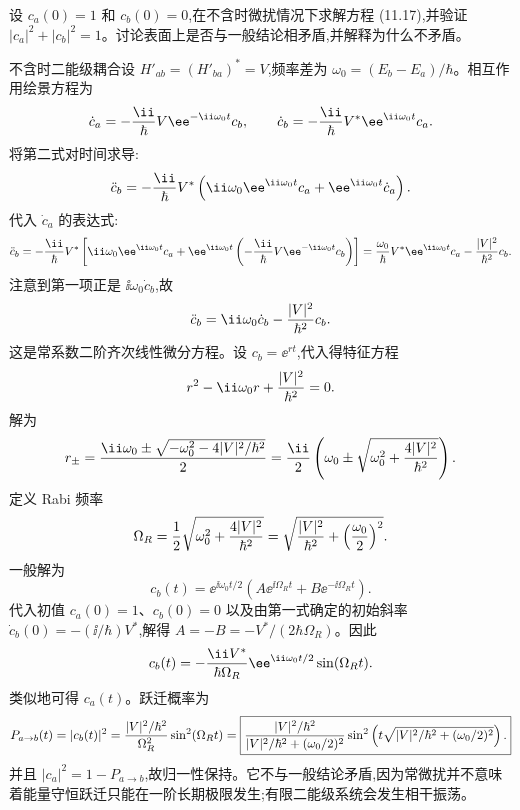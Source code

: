\begin{question}
设 $c_a(0)=1$ 和 $c_b(0)=0$,在不含时微扰情况下求解方程 (11.17),并验证 $|c_a|^2+|c_b|^2=1$。讨论表面上是否与一般结论相矛盾,并解释为什么不矛盾。

\par\smallskip
{}

\end{question}
\begin{solution}
不含时二能级耦合设 $H'_{ab}=(H'_{ba})^*=V$,频率差为 $\omega_0=(E_b-E_a)/\hbar$。相互作用绘景方程为
\[
\dot c_a=-{\ii\over\hbar}V \ee^{-\ii\omega_0t}c_b,
\qquad
\dot c_b=-{\ii\over\hbar}V^* \ee^{\ii\omega_0t}c_a.
\]
将第二式对时间求导:
\[
\ddot c_b=-{\ii\over\hbar}V^*\left(\ii\omega_0 \ee^{\ii\omega_0t}c_a+\ee^{\ii\omega_0t}\dot c_a\right).
\]
代入 $\dot c_a$ 的表达式:
\[
\ddot c_b=-{\ii\over\hbar}V^*\left[\ii\omega_0 \ee^{\ii\omega_0t}c_a
+\ee^{\ii\omega_0t}\left(-{\ii\over\hbar}V \ee^{-\ii\omega_0t}c_b\right)\right]
={\omega_0\over\hbar}V^* \ee^{\ii\omega_0t}c_a-{|V|^2\over\hbar^2}c_b.
\]
注意到第一项正是 $\ii\omega_0\dot c_b$,故
\[
\ddot c_b=\ii\omega_0\dot c_b-{|V|^2\over\hbar^2}c_b.
\]
这是常系数二阶齐次线性微分方程。设 $c_b=\ee^{rt}$,代入得特征方程
\[
r^2-\ii\omega_0 r+{|V|^2\over\hbar^2}=0.
\]
解为
\[
r_\pm={\ii\omega_0\pm\sqrt{-\omega_0^2-4|V|^2/\hbar^2}\over2}
={\ii\over2}\left(\omega_0\pm\sqrt{\omega_0^2+{4|V|^2\over\hbar^2}}\right).
\]
定义 Rabi 频率
\[
\Omega_R={1\over2}\sqrt{\omega_0^2+{4|V|^2\over\hbar^2}}
=\sqrt{{|V|^2\over\hbar^2}+\left({\omega_0\over2}\right)^2}.
\]
一般解为
\[
c_b(t)=\ee^{\ii\omega_0t/2}\left(A \ee^{\ii\Omega_R t}+B \ee^{-\ii\Omega_R t}\right).
\]
代入初值 $c_a(0)=1$、$c_b(0)=0$ 以及由第一式确定的初始斜率 $\dot c_b(0)=-(\ii/\hbar)V^*$,解得 $A=-B=-V^*/(2\hbar\Omega_R)$。因此
\[
c_b(t)=-{\ii V^*\over\hbar\Omega_R}\ee^{\ii\omega_0t/2}\sin(\Omega_R t).
\]
类似地可得 $c_a(t)$。跃迁概率为
\[
P_{a\to b}(t)=|c_b(t)|^2
={|V|^2/\hbar^2\over\Omega_R^2}\sin^2(\Omega_R t)
=\boxed{{|V|^2/\hbar^2\over|V|^2/\hbar^2+(\omega_0/2)^2}
\sin^2\left(t\sqrt{|V|^2/\hbar^2+(\omega_0/2)^2}\right).}
\]
并且 $|c_a|^2=1-P_{a\to b}$,故归一性保持。它不与一般结论矛盾,因为常微扰并不意味着能量守恒跃迁只能在一阶长期极限发生;有限二能级系统会发生相干振荡。
\end{solution}

